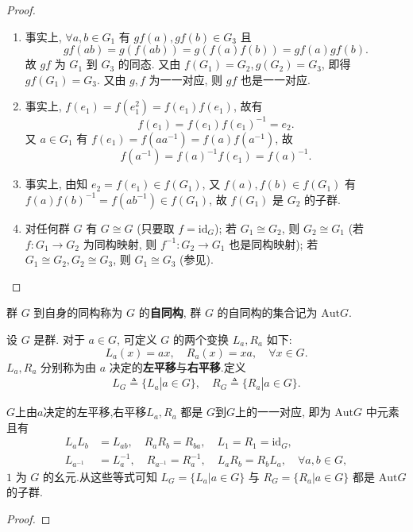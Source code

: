\documentclass[../../main.tex]{subfiles}%
\begin{document}
\begin{proof}
\begin{enumerate}[(1)]
\item 事实上, \( \forall a,b \in G_1 \) 有 \( gf(a), gf(b) \in G_3 \) 且
\[
gf(ab) = g(f(ab)) = g(f(a)f(b)) = gf(a)gf(b).
\]
故 \( gf \) 为 \( G_1 \) 到 \( G_3 \) 的同态. 又由 \( f(G_1) = G_2, g(G_2) = G_3 \), 即得 \( gf(G_1) = G_3 \). 又由 \( g,f \) 为一一对应, 则 \( gf \) 也是一一对应.

\item 事实上, \( f(e_1) = f(e_1^2) = f(e_1)f(e_1) \), 故有
\[
f(e_1) = f(e_1)f(e_1)^{-1} = e_2.
\]
又 \( a \in G_1 \) 有 \( f(e_1) = f(aa^{-1}) = f(a)f(a^{-1}) \), 故
\[
f(a^{-1}) = f(a)^{-1}f(e_1) = f(a)^{-1}.
\]

\item 事实上, 由知 \( e_2 = f(e_1) \in f(G_1) \), 又 \( f(a),f(b) \in f(G_1) \) 有 \( f(a)f(b)^{-1} = f(ab^{-1}) \in f(G_1) \), 故 \( f(G_1) \) 是 \( G_2 \) 的子群.

\item 对任何群 \( G \) 有 \( G \cong G \) (只要取 \( f = \text{id}_G \)); 若 \( G_1 \cong G_2 \), 则 \( G_2 \cong G_1 \) (若 \( f: G_1 \to G_2 \) 为同构映射, 则 \( f^{-1}: G_2 \to G_1 \) 也是同构映射); 若 \( G_1 \cong G_2, G_2 \cong G_3 \), 则 \( G_1 \cong G_3 \) (参见).
\end{enumerate}
\end{proof}

\begin{definition}
群 \( G \) 到自身的同构称为 \( G \) 的\textbf{自同构}, 群 \( G \) 的自同构的集合记为 \( \text{Aut}G \).
\end{definition}

\begin{definition}
设 \( G \) 是群. 对于 \( a \in G \), 可定义 \( G \) 的两个变换 \( L_a, R_a \) 如下:
\[
L_a(x) = ax, \quad R_a(x) = xa, \quad \forall x \in G.
\]
\( L_a, R_a \) 分别称为由 \( a \) 决定的\textbf{左平移}与\textbf{右平移}.定义
\begin{align*}
L_G\triangleq \{L_a|a\in G\},\quad R_G\triangleq \{R_a|a\in G\}.
\end{align*}
\end{definition}

\begin{proposition}\label{proposition:左右平移是群的自同构}
$G$上由$a$决定的左平移,右平移\( L_a, R_a \) 都是 \( G \)到$G$上的一一对应, 即为 \( \text{Aut}G \) 中元素且有
\begin{align*}
L_aL_b &= L_{ab}, \quad R_aR_b = R_{ba}, \quad L_1 = R_1 = \text{id}_G, \\
L_{a^{-1}} &= L_a^{-1}, \quad R_{a^{-1}} = R_a^{-1}, \quad L_aR_b = R_bL_a, \quad \forall a,b \in G,
\end{align*}
\( 1 \) 为 \( G \) 的幺元.从这些等式可知 \( L_G = \{L_a|a \in G\} \) 与 \( R_G = \{R_a|a \in G\} \) 都是 \( \text{Aut}G \) 的子群.
\end{proposition}
\begin{proof}

\end{proof}
\end{document}
